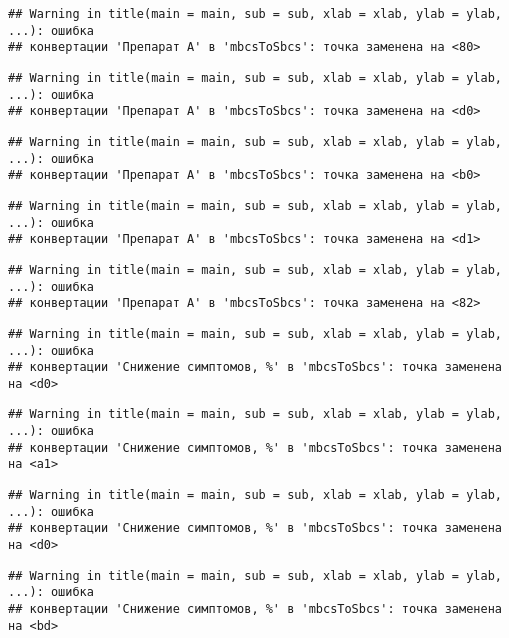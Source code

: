 \documentclass[
]{article}
\begin{document}
\begin{verbatim}
## Warning in title(main = main, sub = sub, xlab = xlab, ylab = ylab, ...): ошибка
## конвертации 'Препарат A' в 'mbcsToSbcs': точка заменена на <80>
\end{verbatim}

\begin{verbatim}
## Warning in title(main = main, sub = sub, xlab = xlab, ylab = ylab, ...): ошибка
## конвертации 'Препарат A' в 'mbcsToSbcs': точка заменена на <d0>
\end{verbatim}

\begin{verbatim}
## Warning in title(main = main, sub = sub, xlab = xlab, ylab = ylab, ...): ошибка
## конвертации 'Препарат A' в 'mbcsToSbcs': точка заменена на <b0>
\end{verbatim}

\begin{verbatim}
## Warning in title(main = main, sub = sub, xlab = xlab, ylab = ylab, ...): ошибка
## конвертации 'Препарат A' в 'mbcsToSbcs': точка заменена на <d1>
\end{verbatim}

\begin{verbatim}
## Warning in title(main = main, sub = sub, xlab = xlab, ylab = ylab, ...): ошибка
## конвертации 'Препарат A' в 'mbcsToSbcs': точка заменена на <82>
\end{verbatim}

\begin{verbatim}
## Warning in title(main = main, sub = sub, xlab = xlab, ylab = ylab, ...): ошибка
## конвертации 'Снижение симптомов, %' в 'mbcsToSbcs': точка заменена на <d0>
\end{verbatim}

\begin{verbatim}
## Warning in title(main = main, sub = sub, xlab = xlab, ylab = ylab, ...): ошибка
## конвертации 'Снижение симптомов, %' в 'mbcsToSbcs': точка заменена на <a1>
\end{verbatim}

\begin{verbatim}
## Warning in title(main = main, sub = sub, xlab = xlab, ylab = ylab, ...): ошибка
## конвертации 'Снижение симптомов, %' в 'mbcsToSbcs': точка заменена на <d0>
\end{verbatim}

\begin{verbatim}
## Warning in title(main = main, sub = sub, xlab = xlab, ylab = ylab, ...): ошибка
## конвертации 'Снижение симптомов, %' в 'mbcsToSbcs': точка заменена на <bd>
\end{verbatim}
\end{document}
